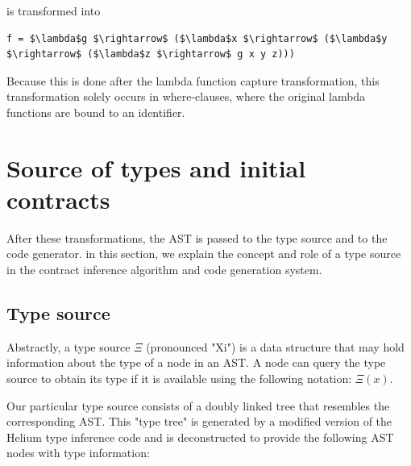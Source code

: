 \documentclass[10pt]{report}
\begin{document}
is transformed into

\begin{lstlisting}[caption=Result of lambda argument expansion transformation.,mathescape]
f = $\lambda$g $\rightarrow$ ($\lambda$x $\rightarrow$ ($\lambda$y $\rightarrow$ ($\lambda$z $\rightarrow$ g x y z)))
\end{lstlisting}

Because this is done after the lambda function capture transformation, this transformation solely occurs in where-clauses, where the original lambda functions are bound to an identifier.

\section{Source of types and initial contracts}
\label{sourceoftypes}
After these transformations, the AST is passed to the type source and to the code generator.
in this section, we explain the concept and role of a type source in the contract inference algorithm and code generation system.

\subsection{Type source}


Abstractly, a type source $\Xi$ (pronounced "Xi") is a data structure that may hold information about the type of a node in an AST.
A node can query the type source to obtain its type if it is available using the following notation: $\Xi( x )$.

Our particular type source consists of a doubly linked tree that resembles the corresponding AST.
This "type tree" is generated by a modified version of the Helium type inference code and is deconstructed to provide the following AST nodes with type information:
\end{document}
